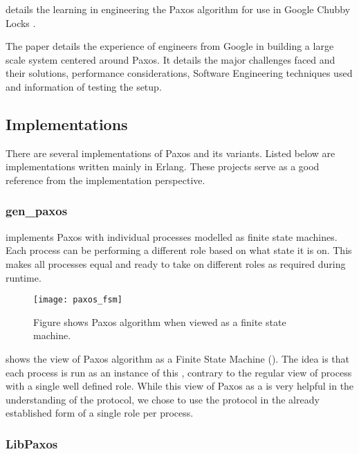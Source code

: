 \cite{ChandraGR07}
details the learning in engineering the Paxos algorithm for use in
Google Chubby Locks \citep{Burrows06}.

The paper details the experience of engineers from Google in building a
large scale system centered around Paxos. It details the major challenges faced
and their solutions, performance considerations, Software Engineering techniques
used and information of testing the setup.

\subsection{Implementations}

There are several implementations of Paxos and its variants. Listed below are
implementations written mainly in Erlang. These projects serve as a good
reference from the implementation perspective.

\subsubsection{gen\_paxos}

\citep{Uenishi2012} implements Paxos with
individual processes modelled as finite state machines. Each process can
be performing a different role based on what state it is on. This
makes all processes equal and ready to take on different roles
as required during runtime.
   
\begin{figure}
  \begin{whole}
  \texttt{[image: paxos\_fsm]}
  \caption[Paxos ]{%
    Figure shows Paxos algorithm when viewed as a finite state machine.}
  \label{figure:paxos.fsm}
  \end{whole}
\end{figure}

 shows the view of Paxos algorithm as a Finite State
Machine (). The idea is that each process is run as an instance of 
this , contrary to the regular view of process with a single well
defined role. While this view of Paxos as a  is very helpful in the
understanding of the protocol, we chose to use the protocol in the already
established form of a single role per process.

\subsubsection{LibPaxos}

